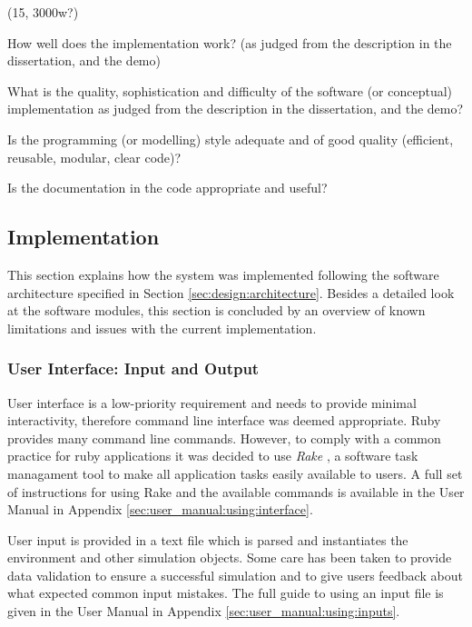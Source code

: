 
(15, 3000w?)

How well does the implementation work? (as judged from the description in the
dissertation, and the demo)

What is the quality, sophistication and difficulty of the software (or
conceptual) implementation as judged from the description in the dissertation,
and the demo?

Is the programming (or modelling) style adequate and of good quality
(efficient, reusable, modular, clear code)?

Is the documentation in the code appropriate and useful?


\subsection{Implementation}

This section explains how the system was implemented following the software
architecture specified in Section \ref{sec:design:architecture}. Besides a
detailed look at the software modules, this section is concluded by an overview
of known limitations and issues with the current implementation.


\subsubsection{User Interface: Input and Output}

User interface is a low-priority requirement and needs to provide minimal
interactivity, therefore command line interface was deemed appropriate. Ruby
provides many command line commands. However, to comply with a common practice
for ruby applications it was decided to use \textit{Rake} \parencite{Rake}, a
software task managament tool to make all application tasks easily available to
users. A full set of instructions for using Rake and the available commands is
available in the User Manual in Appendix \ref{sec:user_manual:using:interface}.

User input is provided in a text file which is parsed and instantiates the
environment and other simulation objects. Some care has been taken to provide
data validation to ensure a successful simulation and to give users feedback
about what expected common input mistakes. The full guide to using an input
file is given in the User Manual in Appendix
\ref{sec:user_manual:using:inputs}.


